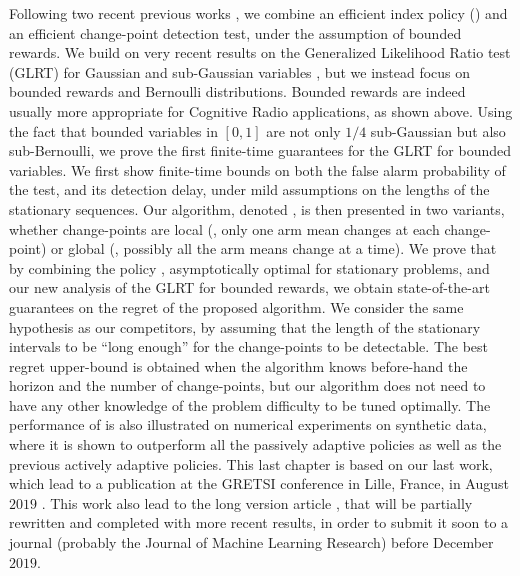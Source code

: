 Following two recent previous works \cite{LiuLeeShroff17,CaoZhenKvetonXie18}, we combine an efficient index policy (\klUCB) and an efficient change-point detection test, under the assumption of bounded rewards.
We build on very recent results on the Generalized Likelihood Ratio test (GLRT) for Gaussian and sub-Gaussian variables \cite{Maillard2018GLR}, but we instead focus on bounded rewards and Bernoulli distributions.
Bounded rewards are indeed usually more appropriate for Cognitive Radio applications, as shown above.
Using the fact that bounded variables in $[0,1]$ are not only $1/4$ sub-Gaussian but also sub-Bernoulli, we prove the first finite-time guarantees for the GLRT for bounded variables.
We first show finite-time bounds on both the false alarm probability of the test, and its detection delay, under mild assumptions on the lengths of the stationary sequences.
Our algorithm, denoted \GLRklUCB, is then presented in two variants, whether change-points are local (\ie, only one arm mean changes at each change-point) or global (\ie, possibly all the arm means change at a time).
%
We prove that by combining the policy \klUCB, asymptotically optimal for stationary problems, and our new analysis of the GLRT for bounded rewards, we obtain state-of-the-art guarantees on the regret of the proposed algorithm.
We consider the same hypothesis as our competitors, by assuming that the length of the stationary intervals to be ``long enough'' for the change-points to be detectable.
The best regret upper-bound is obtained when the algorithm knows before-hand the horizon and the number of change-points, but our algorithm does not need to have any other knowledge of the problem difficulty to be tuned optimally.
%
The performance of \GLRklUCB{} is also illustrated on numerical experiments on synthetic data, where it is shown to outperform all the passively adaptive policies as well as the previous actively adaptive policies.
%
This last chapter is based on our last work, which lead to a publication at the GRETSI conference in Lille, France, in August $2019$ \cite{Besson2019Gretsi}.
This work also lead to the long version article \cite{Besson2019GLRT}, that will be partially rewritten and completed with more recent results, in order to submit it soon to a journal (probably the Journal of Machine Learning Research) before December $2019$.


